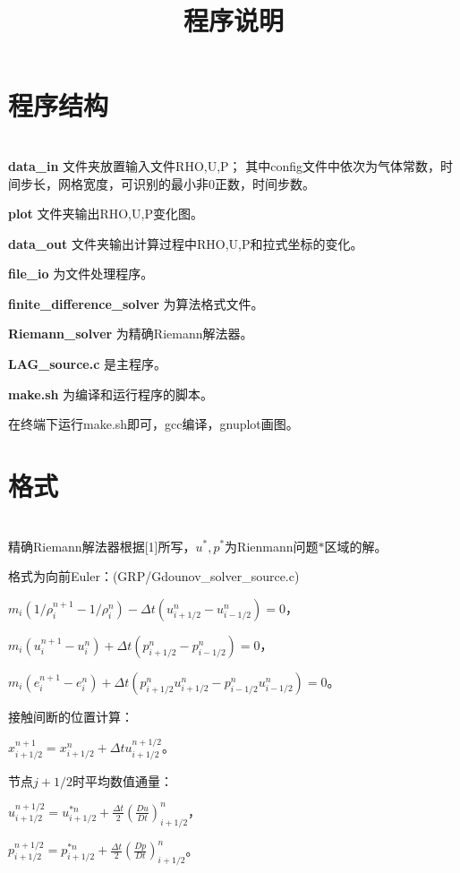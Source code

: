 \documentclass{article}
\begin{document}
\title{程序说明}
\date{}
\maketitle

\section{程序结构}
\ \\

\textbf{data\_in} 文件夹放置输入文件RHO,U,P；
其中config文件中依次为气体常数，时间步长，网格宽度，可识别的最小非0正数，时间步数。

\textbf{plot} 文件夹输出RHO,U,P变化图。

\textbf{data\_out} 文件夹输出计算过程中RHO,U,P和拉式坐标的变化。

\textbf{file\_io} 为文件处理程序。

\textbf{finite\_difference\_solver} 为算法格式文件。

\textbf{Riemann\_solver} 为精确Riemann解法器。

\textbf{LAG\_source.c} 是主程序。

\textbf{make.sh} 为编译和运行程序的脚本。

在终端下运行make.sh即可，gcc编译，gnuplot画图。

\section{格式}
\ \\

精确Riemann解法器根据[1]所写，$u^{*},p^{*}$为Rienmann问题$*$区域的解。

格式为向前Euler：(GRP/Gdounov\_solver\_source.c)

$m_i(1/\rho_i^{n+1}-1/\rho_i^{n})-\Delta t(u_{i+1/2}^n-u_{i-1/2}^n)=0$，

$m_i(u_i^{n+1}-u_i^{n})+\Delta t(p_{i+1/2}^n-p_{i-1/2}^n)=0$，

$m_i(e_i^{n+1}-e_i^{n})+\Delta t(p_{i+1/2}^nu_{i+1/2}^n-p_{i-1/2}^nu_{i-1/2}^n)=0$。

接触间断的位置计算：

$x_{i+1/2}^{n+1}=x_{i+1/2}^{n}+\Delta tu_{i+1/2}^{n+1/2}$。

节点$j+1/2$时平均数值通量：

$u_{i+1/2}^{n+1/2}=u_{i+1/2}^{*n}+\frac{\Delta t}{2}(\frac{D u}{D t})_{i+1/2}^{n}$，

$p_{i+1/2}^{n+1/2}=p_{i+1/2}^{*n}+\frac{\Delta t}{2}(\frac{D p}{D t})_{i+1/2}^{n}$。
\end{document}
